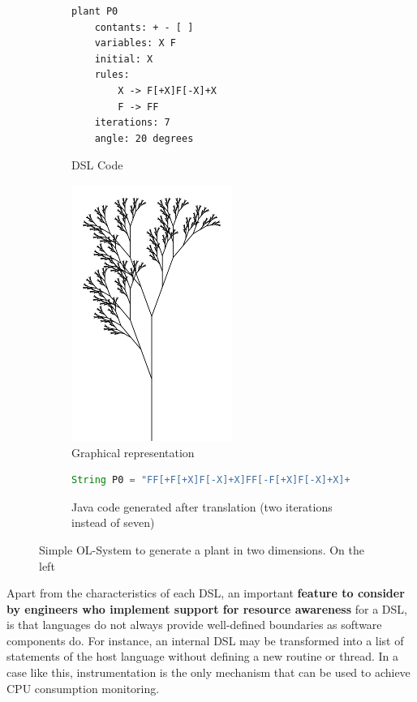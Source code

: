 \begin{figure}[ht]
\begin{mdframed}
\begin{subfigure}{0.45\textwidth}
\begin{lstlisting}[style={OL-systems}]
plant P0
	contants: + - [ ]
	variables: X F
	initial: X
	rules:
		X -> F[+X]F[-X]+X
		F -> FF
	iterations: 7
	angle: 20 degrees
\end{lstlisting}
\caption{DSL Code}\label{fig:l-system-code}
\end{subfigure}
\hspace{0.6cm}
\begin{subfigure}{0.45\textwidth}
\centering
\includegraphics[scale=0.35]{./chapter2/fig/plant.png}
\caption{Graphical representation}\label{fig:plant}
\end{subfigure}
\hspace{2.6cm}
\begin{subfigure} {\linewidth}\centering
\begin{lstlisting}[language=java, basicstyle=\footnotesize, stringstyle=\footnotesize\color{green}]
String P0 = "FF[+F[+X]F[-X]+X]FF[-F[+X]F[-X]+X]+F[+X]F[-X]+X";
\end{lstlisting}
\caption{Java code generated after translation (two iterations instead of seven)}\label{fig:l-system-generated}
\end{subfigure}
\end{mdframed}
\caption{Simple OL-System to generate a plant in two dimensions. On the left} \label{lst:OL-system-example}
\end{figure}

Apart from the characteristics of each DSL, an important \textbf{feature to consider by engineers who implement support for resource awareness} for a DSL,
is that languages do not always provide well-defined boundaries as software components do.
For instance, an internal DSL may be transformed into a list of statements of the host language without defining a new routine or thread.
In a case like this, instrumentation is the only mechanism that can be used to achieve CPU consumption monitoring.

